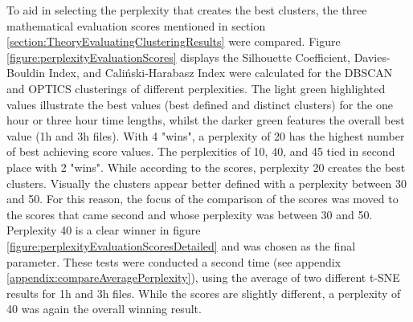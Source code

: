 To aid in selecting the perplexity that creates the best clusters, the three mathematical evaluation scores mentioned in section \ref{section:TheoryEvaluatingClusteringResults} were compared. Figure \ref{figure:perplexityEvaluationScores} displays the Silhouette Coefficient, Davies-Bouldin Index, and Caliński-Harabasz Index were calculated for the DBSCAN and OPTICS clusterings of different perplexities. The light green highlighted values illustrate the best values (best defined and distinct clusters) for the one hour or three hour time lengths, whilst the darker green features the overall best value (1h and 3h files). With 4 "wins", a perplexity of 20 has the highest number of best achieving score values. The perplexities of 10, 40, and 45 tied in second place with 2 "wins". While according to the scores, perplexity 20 creates the best clusters. Visually the clusters appear better defined with a perplexity between 30 and 50. For this reason, the focus of the comparison of the scores was moved to the scores that came second and whose perplexity was between 30 and 50. Perplexity 40 is a clear winner in figure \ref{figure:perplexityEvaluationScoresDetailed} and was chosen as the final parameter. These tests were conducted a second time (see appendix \ref{appendix:compareAveragePerplexity}), using the average of two different t-SNE results for 1h and 3h files. While the scores are slightly different, a perplexity of 40 was again the overall winning result.



